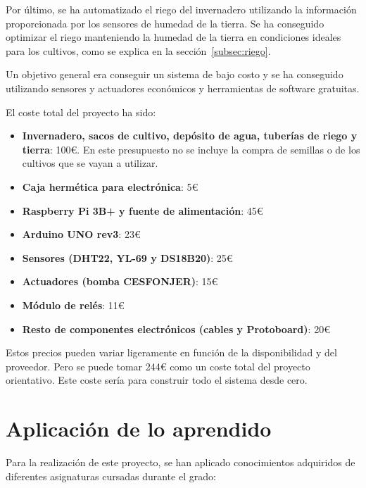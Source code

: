 \documentclass[a4paper, 12pt, oneside]{book}
\begin{document}
Por último, se ha automatizado el riego del invernadero utilizando la información proporcionada por los sensores de humedad de la tierra. Se ha conseguido optimizar el riego manteniendo la humedad de la tierra en condiciones ideales para los cultivos, como se explica en la sección~\ref{subsec:riego}.

Un objetivo general era conseguir un sistema de bajo costo y se ha conseguido utilizando sensores y actuadores económicos y herramientas de software gratuitas.

El coste total del proyecto ha sido:

\begin{itemize}
\item \textbf{Invernadero, sacos de cultivo, depósito de agua, tuberías de riego y tierra}: 100€. En este presupuesto no se incluye la compra de semillas o de los cultivos que se vayan a utilizar.
\item \textbf{Caja hermética para electrónica}: 5€
\item \textbf{Raspberry Pi 3B+ y fuente de alimentación}: 45€
\item \textbf{Arduino UNO rev3}: 23€
\item \textbf{Sensores (DHT22, YL-69 y DS18B20)}: 25€
\item \textbf{Actuadores (bomba CESFONJER)}: 15€
\item \textbf{Módulo de relés}: 11€ 
\item \textbf{Resto de componentes electrónicos (cables y Protoboard)}: 20€
\end{itemize}

Estos precios pueden variar ligeramente en función de la disponibilidad y del proveedor. Pero se puede tomar 244€ como un coste total del proyecto orientativo.
Este coste sería para construir todo el sistema desde cero.   


\section{Aplicación de lo aprendido}
\label{sec:aplicación de lo aprendido}
Para la realización de este proyecto, se han aplicado conocimientos adquiridos de diferentes asignaturas cursadas durante el grado:
\end{document}
